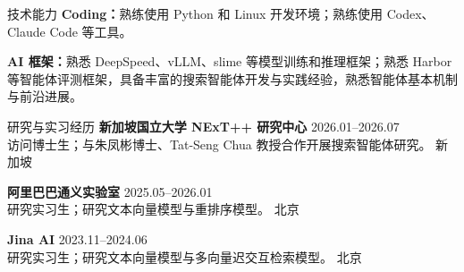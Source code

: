 \documentclass{resume}
\begin{document}
\begin{rSection}{技术能力}
\textbf{Coding：}熟练使用 Python 和 Linux 开发环境；熟练使用 Codex、Claude Code 等工具。

\textbf{AI 框架：}熟悉 DeepSpeed、vLLM、slime 等模型训练和推理框架；熟悉 Harbor 等智能体评测框架，具备丰富的搜索智能体开发与实践经验，熟悉智能体基本机制与前沿进展。
\end{rSection}

\begin{rSection}{研究与实习经历}
\textbf{新加坡国立大学 NExT++ 研究中心} \hfill 2026.01--2026.07 \\
访问博士生；与朱凤彬博士、Tat-Seng Chua 教授合作开展搜索智能体研究。 \hfill 新加坡

\textbf{阿里巴巴通义实验室} \hfill 2025.05--2026.01 \\
研究实习生；研究文本向量模型与重排序模型。 \hfill 北京

\textbf{Jina AI} \hfill 2023.11--2024.06 \\
研究实习生；研究文本向量模型与多向量迟交互检索模型。 \hfill 北京
\end{rSection}
\end{document}
